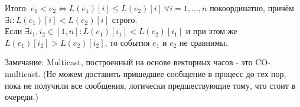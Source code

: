 Итого: $e_1 < e_2 \Leftrightarrow L(e_1)[i] \leq L(e_2)[i]\ \forall i = 1,\ldots, n$ покоординатно, причём \\$\exists i: L(e_1)[i] < L(e_2)[i]$ строго.\\

Если $\exists i_1, i_2 \in [1,n]: L(e_1)[i_1]< L(e_2)[i_1]$ и при этом же $L(e_1)[i_2] >  L(e_2)[i_2] $, то события $e_1$ и $e_2$ не сравнимы.

Замечание: Multicast, построенный на основе векторных часов - это CO-multicast. (Не можем доставить пришедшее сообщение в процесс до тех пор, пока не получили все сообщения, логически предшествующие тому, что стоит в  очереди.)
